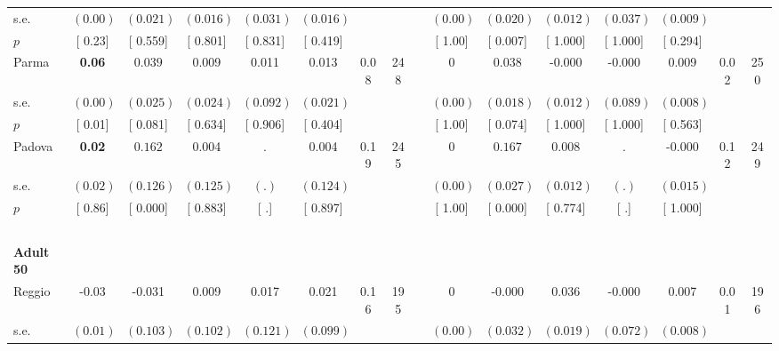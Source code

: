 \begin{longtable}{L{8em} c c c c c c c p{1em} c c c c c c c}
\quad \quad \quad \quad s.e.& $ (     0.00)$ & $ (    0.021)$ & $ (    0.016)$ & $ (    0.031)$ & $ (    0.016)$ & & & & $ (     0.00)$ & $ (    0.020)$ & $ (    0.012)$ & $ (    0.037)$ & $ (    0.009)$ & &  \\*
\quad \quad \quad \quad $ p$ & [     0.23] & [    0.559] & [    0.801] & [    0.831] & [    0.419] & & & & [     1.00] & [    0.007] & [    1.000] & [    1.000] & [    0.294] & &  \\[1em]
\quad \quad \quad Parma& \textbf{     0.06} & $ \mathbf{    0.039}$ &     0.009 &     0.011 &     0.013 &      0.08 &       248 & & 0 & $ \mathbf{    0.038}$ &    -0.000 &    -0.000 &     0.009 &      0.02 &       250  \\*
\quad \quad \quad \quad s.e.& $ (     0.00)$ & $ (    0.025)$ & $ (    0.024)$ & $ (    0.092)$ & $ (    0.021)$ & & & & $ (     0.00)$ & $ (    0.018)$ & $ (    0.012)$ & $ (    0.089)$ & $ (    0.008)$ & &  \\*
\quad \quad \quad \quad $ p$ & [     0.01] & [    0.081] & [    0.634] & [    0.906] & [    0.404] & & & & [     1.00] & [    0.074] & [    1.000] & [    1.000] & [    0.563] & &  \\[1em]
\quad \quad \quad Padova& \textbf{     0.02} & $ \mathbf{    0.162}$ &     0.004 &         . &     0.004 &      0.19 &       245 & & 0 & $ \mathbf{    0.167}$ &     0.008 &         . &    -0.000 &      0.12 &       249  \\*
\quad \quad \quad \quad s.e.& $ (     0.02)$ & $ (    0.126)$ & $ (    0.125)$ & $ (        .)$ & $ (    0.124)$ & & & & $ (     0.00)$ & $ (    0.027)$ & $ (    0.012)$ & $ (        .)$ & $ (    0.015)$ & &  \\*
\quad \quad \quad \quad $ p$ & [     0.86] & [    0.000] & [    0.883] & [        .] & [    0.897] & & & & [     1.00] & [    0.000] & [    0.774] & [        .] & [    1.000] & &  \\[1em]
~\\[1em]
\quad \quad \textbf{Adult 50} & & & & & & & & & & & & & & & \\* 
\quad \quad \quad Reggio& -0.03 &    -0.031 &     0.009 &     0.017 &     0.021 &      0.16 &       195 & & 0 &    -0.000 &     0.036 &    -0.000 &     0.007 &      0.01 &       196  \\*
\quad \quad \quad \quad s.e.& $ (     0.01)$ & $ (    0.103)$ & $ (    0.102)$ & $ (    0.121)$ & $ (    0.099)$ & & & & $ (     0.00)$ & $ (    0.032)$ & $ (    0.019)$ & $ (    0.072)$ & $ (    0.008)$ & &  \\*

\end{longtable}
